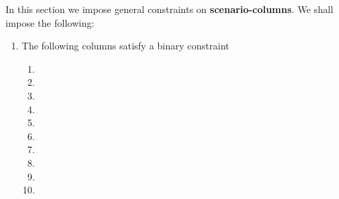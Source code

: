 \begin{center}
\end{center}
In this section we impose general constraints on \textbf{scenario-columns}. We shall impose the following:
\begin{enumerate}
	\item The following columns satisfy a binary constraint \lispDone{}
		\begin{enumerate}
			\item \scenCreateException{}
			\item \scenCreateAbort{}
			\item \scenCreateFCondWillRevert{}
			\item \scenCreateFCondWontRevert{}
			\item \scenCreateNonEmptyInitCodeFailureWillRevert{}
			\item \scenCreateNonEmptyInitCodeFailureWontRevert{}
			\item \scenCreateNonEmptyInitCodeSuccessWillRevert{}
			\item \scenCreateNonEmptyInitCodeSuccessWontRevert{}
			\item \scenCreateEmptyInitCodeWillRevert{}
			\item \scenCreateEmptyInitCodeWontRevert{}
		\end{enumerate}
\end{enumerate}
